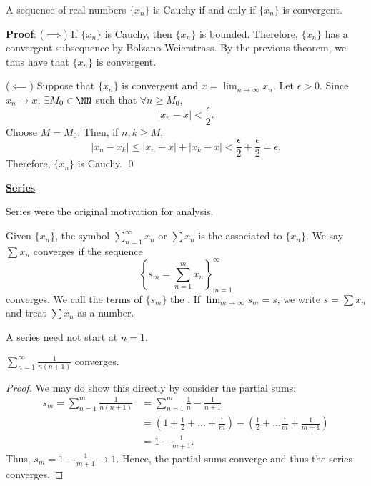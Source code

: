 \begin{theorem}
A sequence of real numbers $\{x_n\}$ is Cauchy if and only if $\{x_n\}$ is convergent.
\end{theorem}
\textbf{Proof}: ($\implies$) If $\{x_n\}$ is Cauchy, then $\{x_n\}$ is bounded. Therefore, $\{x_n\}$ has a convergent subsequence by Bolzano-Weierstrass. By the previous theorem, we thus have that $\{x_n\}$ is convergent.

($\impliedby$) Suppose that $\{x_n\}$ is convergent and $x = \lim_{n\to \infty} x_n$. Let $\epsilon>0$. Since $x_n \to x$, $\exists M_0 \in \NN$ such that $\forall n\geq M_0$,
\[
|x_n-x| < \frac{\epsilon}{2}.
\]
Choose $M = M_0$. Then, if $n,k\geq M$,
\[
|x_n -x_k| \leq |x_n-x| + |x_k-x| < \frac{\epsilon}{2} + \frac{\epsilon}{2} = \epsilon.
\]
Therefore, $\{x_n\}$ is Cauchy. \qed 

\noindent\underline{\textbf{Series}}
\begin{remark}
Series were the original motivation for analysis.
\end{remark}
\begin{definition}
Given $\{x_n\}$, the symbol $\sum_{n=1}^\infty x_n$ or $\sum x_n$ is the  associated to $\{x_n\}$. We say $\sum x_n$ converges if the sequence 
\[
\left\{
s_m = \sum_{n=1}^m x_n
\right\}_{m=1}^\infty
\]
converges. We call the terms of $\{s_m\}$ the . If $\lim_{m\to \infty} s_m = s$, we write $s = \sum x_n$ and treat $\sum x_n$ as a number.
\end{definition}

\begin{remark} A series need not start at $n=1$.
\end{remark}

\begin{example}
$\sum_{n=1}^\infty \frac{1}{n(n+1)}$ converges.
\end{example}
\begin{proof}
We may do show this directly by consider the partial sums:
\begin{align*}
    s_m = \sum_{n=1}^m \frac{1}{n(n+1)} &= \sum_{n=1}^m \frac{1}{n} - \frac{1}{n+1} \\
    &= \left(1+\frac{1}{2} + \dots + \frac{1}{m}\right) -\left(\frac{1}{2} + \dots \frac{1}{m} +\frac{1}{m+1} \right) \\
    &= 1- \frac{1}{m+1}.
\end{align*}
Thus, $s_m = 1-\frac{1}{m+1} \to 1$. Hence, the partial sums converge and thus the series converges.
\end{proof}

